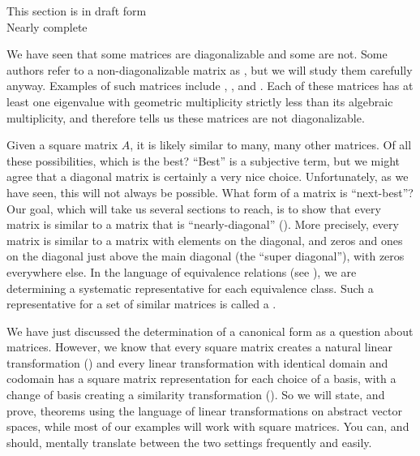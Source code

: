 %
{\sc\large This section is in draft form}\\
{\sc\large Nearly complete}
\par\medskip
%
We have seen that some matrices are diagonalizable and some are not.  Some authors refer to a non-diagonalizable matrix as , but we will study them carefully anyway.  Examples of such matrices include , , and .  Each of these matrices has at least one eigenvalue with geometric multiplicity strictly less than its algebraic multiplicity, and therefore  tells us these matrices are not diagonalizable.\par
%
Given a square matrix $A$, it is likely similar to many, many other matrices.  Of all these possibilities, which is the best?  ``Best'' is a subjective term, but we might agree that a diagonal matrix is certainly a very nice choice.  Unfortunately, as we have seen, this will not always be possible.  What form of a matrix is ``next-best''?  Our goal, which will take us several sections to reach, is to show that every matrix is similar to a matrix that is ``nearly-diagonal'' (). More precisely, every matrix is similar to a matrix with elements on the diagonal, and zeros and ones  on the diagonal just above the main diagonal (the ``super diagonal''), with zeros everywhere else.  In the language of equivalence relations (see ), we are determining a systematic representative for each equivalence class.  Such a representative for a set of similar matrices is called a .\par
%
We have just discussed the determination of a canonical form as a question about matrices.  However, we know that every square matrix creates a natural linear transformation () and every linear transformation with identical domain and codomain has a square matrix representation for each choice of a basis, with a change of basis creating a similarity transformation ().  So we will state, and prove, theorems using the language of linear transformations on abstract vector spaces, while most of our examples will work with square matrices.  You can, and should, mentally translate between the two settings frequently and easily.\par
